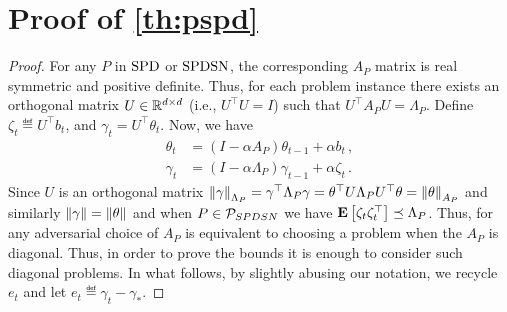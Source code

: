 \section{Proof of \cref{th:pspd}}
\label{sec:pspd}
\thpspd*
\begin{proof}
For any $P$ in $\SPD$ or $\SPDSN$, the corresponding $A_P$ matrix is real symmetric and positive definite. Thus, for each problem instance there exists an orthogonal matrix $U\in \R^{d\times d}$ (i.e., $U^\top U=I$) such that $U^\top A_P U=\Lambda_P$. Define $\zeta_t\eqdef U^\top b_t$, and $\gamma_t=U^\top \theta_t$. Now, we have
\begin{align}
\theta_t&=(I-\alpha A_P)\theta_{t-1}+\alpha b_t\,,\\
\label{eq:gamrec}\gamma_t&=(I-\alpha \Lambda_P)\gamma_{t-1}+\alpha \zeta_t\,.
\end{align}
Since $U$ is an orthogonal matrix $\norm{\gamma}_{\Lambda_P}=\gamma^\top \Lambda_P \gamma= \theta^\top U \Lambda_P U^\top \theta=\norm{\theta}_{A_P}$ and similarly $\norm{\gamma}=\norm{\theta}$ and when $P\in \P_{SPDSN}$ we have $\EE{\zeta_t \zeta_t^\top}\preceq \Lambda_P$. Thus, for any adversarial choice of $A_P$ is equivalent to choosing a problem when the $A_P$ is diagonal. Thus, in order to prove the bounds it is enough to consider such diagonal problems. In what follows, by slightly abusing our notation, we recycle $e_t$ and let $e_t\eqdef\gamma_t-\gamma_*$.


\end{proof}
